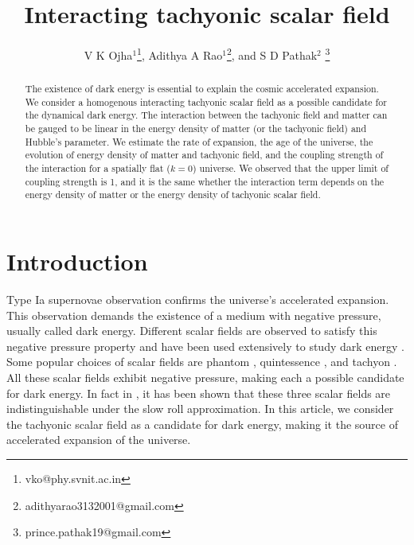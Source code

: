 \documentclass[preprint,aps,floatfix]{revtex4}
\begin{document}
\title{Interacting tachyonic scalar field }

  \author{V K Ojha${}^1$\footnote{vko@phy.svnit.ac.in}, Adithya A Rao${}^1$\footnote{adithyarao3132001@gmail.com}, and S D Pathak${}^2$	\footnote{prince.pathak19@gmail.com}}
  

   \begin{abstract}
    The existence of dark energy is essential to explain the cosmic accelerated expansion.  We consider a homogenous interacting tachyonic scalar field as a possible candidate for the dynamical dark energy. The interaction between the tachyonic field and matter can be gauged to be linear in the energy density of matter (or the tachyonic field) and Hubble's parameter. We estimate the rate of expansion, the age of the universe, the evolution of energy density of matter and tachyonic field, and the coupling strength of the interaction for a spatially flat ($k=0$) universe. We observed that the upper limit of coupling strength is 1, and it is the same whether the interaction term depends on the energy density of matter or the energy density of tachyonic scalar field.
  
   \end{abstract}
   
  \maketitle


  \section{Introduction}
\noindent
 Type Ia supernovae \cite{Riess_1998,Perlmutter_1999} observation confirms the universe's accelerated expansion. This observation demands the existence of a medium with negative pressure, usually called dark energy. Different scalar fields are observed to satisfy this negative pressure property and have been used extensively to study dark energy \cite{copeland2006dynamics,padmanabhan2002can,verma2014cosmic,verma2014bicep2}. Some popular choices of scalar fields are phantom \cite{cruz2022phantom,narawade2022phantom,tripathy2020phantom,johri2004phantom,dkabrowski2006quantum,dabrowski2003phantom}, quintessence \cite{adil2023quintessential,yang2019constraints,wetterich2022quantum,piedipalumbo2020noether}, and tachyon \cite{felegary2020evolution,singh2019low,koussour2022interacting,sadeghi2014phenomenological,gorini2004tachyons,kundu2021interacting}. All these scalar fields exhibit negative pressure, making each a possible candidate for dark energy. In fact in \cite{Kumar:2023qum}, it has been shown that these three scalar fields are indistinguishable under the slow roll approximation. In this article, we consider the tachyonic scalar field as a candidate for dark energy, making it the source of accelerated expansion of the universe.
\end{document}
